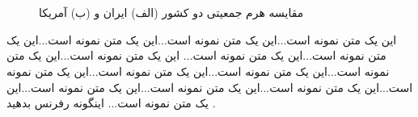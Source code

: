 ‎\begin{figure}[t!]‎
	\centering
	\qquad
	\caption[عنوان شکل در فهرست اشکال]
	{مقایسه هرم جمعیتی دو کشور (الف) ایران و (ب) آمریکا }
	\label{fig:intro:populationpyramid}
\end{figure} 

این یک متن نمونه است...این یک متن نمونه است...این یک متن نمونه است...این یک متن نمونه است...این یک متن نمونه است... این یک متن نمونه است...این یک متن نمونه است...این یک متن نمونه است...این یک متن نمونه است...این یک متن نمونه است...این یک متن نمونه است...این یک متن نمونه است...این یک متن نمونه است...این یک متن نمونه است... 
اینگونه رفرنس بدهید \cite{karimi2020soft, mohammadimohammadabadi}. 


